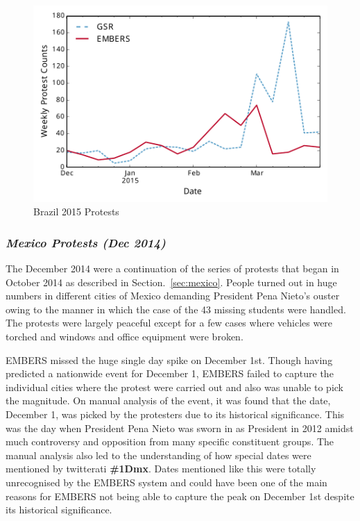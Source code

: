 \documentclass[11pt,a4paper,extrafontsizes,oneside]{article}
\begin{document}
\begin{figure}
\centering
\includegraphics[width=.8\columnwidth]{brazilMarch15}
\caption{Brazil 2015 Protests}
\label{fig:brazilSpring}
\end{figure}

\subsubsection{\it Mexico Protests (Dec 2014)}
The December 2014 were a continuation of the series of protests that began in October 2014
as described in Section.~\ref{sec:mexico}. People turned out in huge numbers in different cities of Mexico demanding
President Pena Nieto's ouster owing to the manner in which the case of the 43 missing students were handled.
The protests were largely peaceful except for a few cases where vehicles were torched and windows and office equipment
were broken.

EMBERS missed the huge single day spike on December 1st. Though having predicted a nationwide event for
December 1, EMBERS failed to capture the individual cities where the protest were carried out and also was unable
to pick the magnitude. On manual analysis of the event, it was found that the date, December 1,  was picked by the protesters due to
its historical significance. This was the day when President Pena Nieto was sworn
in as President in 2012 amidst much controversy and opposition from
many specific constituent groups. The manual analysis also led to the understanding of how
special dates were mentioned by twitterati {\bf \#1Dmx}. Dates mentioned like this were totally unrecognised by the EMBERS
system and could have been one of the main reasons for EMBERS not being able to capture the peak on December 1st despite its
historical significance.
\end{document}
